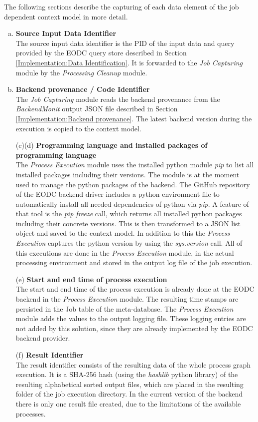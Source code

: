 \documentclass[draft,final]{vutinfth} %
\begin{document}
The following sections describe the capturing of each data element of the job dependent context model in more detail.
\begin{enumerate}[(a)]
\item \textbf{Source Input Data Identifier} \\
	The source input data identifier is the PID of the input data and query provided by the EODC query store described in Section \ref{Implementation:Data Identification}. It is forwarded to the \textit{Job Capturing} module by the \textit{Processing Cleanup} module. 

\item \textbf{Backend provenance / Code Identifier} \\
	The \textit{Job Capturing} module reads the backend provenance from the \textit{BackendMonit} output JSON file described in Section \ref{Implementation:Backend provenance}. The latest backend version during the execution is copied to the context model.

\item[(c)(d)] \textbf{Programming language and  installed packages of programming language} \\
	The \textit{Process Execution} module uses the installed python module \textit{pip} to list all installed packages including their versions. The module is at the moment used to manage the python packages of the backend. The GitHub repository of the EODC backend driver includes a python environment file to automatically install all needed dependencies of python via \textit{pip}. A feature of that tool is the \textit{pip freeze} call, which returns all installed python packages including their concrete versions. This is then transformed to a JSON list object and saved to the context model. In addition to this the \textit{Process Execution} captures the python version by using the \textit{sys.version} call. All of this executions are done in the \textit{Process Execution} module, in the actual processing environment and stored in the output log file of the job execution.    

\item[(e)] \textbf{Start and end time of process execution} \\
	The start and end time of the process execution is already done at the EODC backend in the  \textit{Process Execution} module. The resulting time stamps are persisted in the Job table of the meta-database. The \textit{Process Execution} module adds the values to the output logging file. These logging entries are not added by this solution, since they are already implemented by the EODC backend provider.  

\item[(f)] \textbf{Result Identifier} \\
	The result identifier consists of the resulting data of the whole process graph execution. It is a SHA-256 hash (using the \textit{hashlib} python library) of the resulting alphabetical sorted output files, which are placed in the resulting folder of the job execution directory. In the current version of the backend there is only one result file created, due to the limitations of the available processes.  
\end{enumerate}
\end{document}
